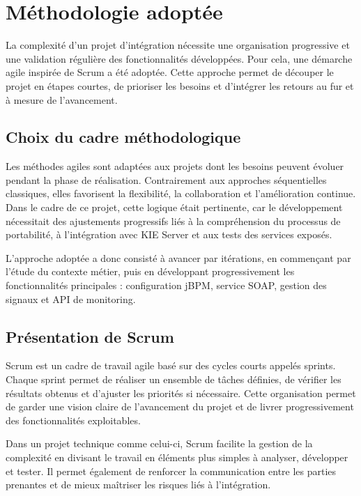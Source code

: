 \documentclass[12pt,a4paper]{report}
\begin{document}
\section{Méthodologie adoptée}
La complexité d'un projet d'intégration nécessite une organisation progressive et une validation régulière des fonctionnalités développées. Pour cela, une démarche agile inspirée de Scrum a été adoptée. Cette approche permet de découper le projet en étapes courtes, de prioriser les besoins et d'intégrer les retours au fur et à mesure de l'avancement.

\subsection{Choix du cadre méthodologique}
Les méthodes agiles sont adaptées aux projets dont les besoins peuvent évoluer pendant la phase de réalisation. Contrairement aux approches séquentielles classiques, elles favorisent la flexibilité, la collaboration et l'amélioration continue. Dans le cadre de ce projet, cette logique était pertinente, car le développement nécessitait des ajustements progressifs liés à la compréhension du processus de portabilité, à l'intégration avec KIE Server et aux tests des services exposés.

L'approche adoptée a donc consisté à avancer par itérations, en commençant par l'étude du contexte métier, puis en développant progressivement les fonctionnalités principales : configuration jBPM, service SOAP, gestion des signaux et API de monitoring.

\subsection{Présentation de Scrum}
Scrum est un cadre de travail agile basé sur des cycles courts appelés sprints. Chaque sprint permet de réaliser un ensemble de tâches définies, de vérifier les résultats obtenus et d'ajuster les priorités si nécessaire. Cette organisation permet de garder une vision claire de l'avancement du projet et de livrer progressivement des fonctionnalités exploitables.

Dans un projet technique comme celui-ci, Scrum facilite la gestion de la complexité en divisant le travail en éléments plus simples à analyser, développer et tester. Il permet également de renforcer la communication entre les parties prenantes et de mieux maîtriser les risques liés à l'intégration.


\end{document}
